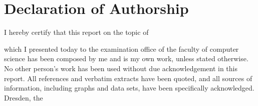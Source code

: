  \chapter*{Declaration of Authorship}

	I hereby certify that this report on the topic of 
	  \begin{center}
	     \textit{\@title}
	     \end{center}
	     which I presented today to the examination office of the faculty of computer science has been composed by me and is my own work, unless stated otherwise. No other person’s work has been used without due acknowledgement in this report. All references and verbatim extracts have been quoted, and all sources of information, including graphs and data sets, have been specifically acknowledged. 
\\[2cm]
	
	    Dresden, the \@date\\[3cm]
	    \@author

